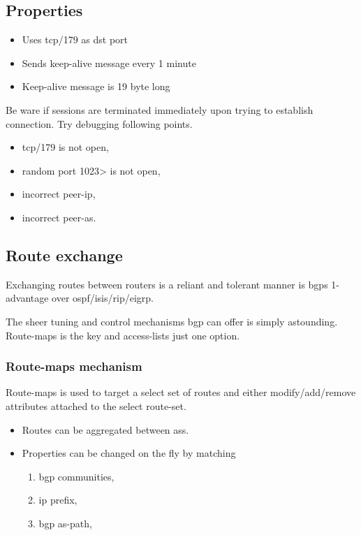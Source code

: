 \subsection{Properties}

\begin{itemize}
    \item Uses tcp/179 as \gls{dst} port
    \item Sends keep-alive message every 1 minute
    \item Keep-alive message is 19 byte long
\end{itemize}

Be ware if sessions are terminated immediately upon trying to establish connection. Try debugging following points.

\begin{itemize}
    \item tcp/179 is not open,
    \item random port 1023> is not open,
    \item incorrect peer-ip,
    \item incorrect peer-as.
\end{itemize}

\subsection{Route exchange}

Exchanging routes between routers is a reliant and tolerant manner is \glspl{bgp} 1-advantage over \gls{ospf}/\gls{isis}/\gls{rip}/\gls{eigrp}.

The sheer tuning and control mechanisms \gls{bgp} can offer is simply astounding. Route-maps is the key and access-lists just one option.

\subsubsection[Route-maps]{Route-maps mechanism}

Route-maps is used to target a select set of routes and either modify/add/remove attributes attached to the select route-set.

\begin{itemize}
    \item Routes can be aggregated between \glspl{as}.
    \item Properties can be changed on the fly by matching
    \begin{enumerate}[label={\alph*)}]
        \item \Gls{bgp} communities,
        \item \Gls{ip} prefix,
        \item \Gls{bgp} as-path, 
    \end{enumerate}
\end{itemize}

